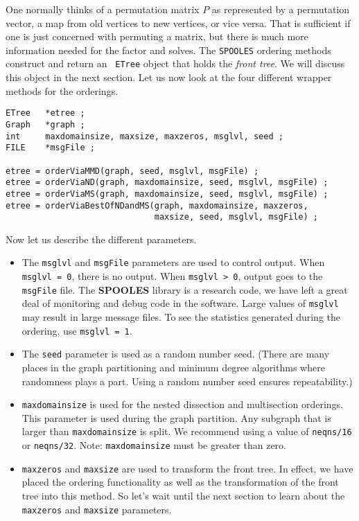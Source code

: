 \par
One normally thinks of a permutation matrix $P$ as represented by a
permutation vector, a map from old vertices to new vertices, or
vice versa.
That is sufficient if one is just concerned with permuting a
matrix, but there is much more information needed for the factor
and solves.
The {\tt SPOOLES} ordering methods construct and return an {\tt
ETree} object that holds the {\it front tree}.
We will discuss this object in the next section.
Let us now look at the four different wrapper methods for the
orderings.
\begin{verbatim}
ETree   *etree ;
Graph   *graph ;
int     maxdomainsize, maxsize, maxzeros, msglvl, seed ;
FILE    *msgFile ;

etree = orderViaMMD(graph, seed, msglvl, msgFile) ;
etree = orderViaND(graph, maxdomainsize, seed, msglvl, msgFile) ;
etree = orderViaMS(graph, maxdomainsize, seed, msglvl, msgFile) ;
etree = orderViaBestOfNDandMS(graph, maxdomainsize, maxzeros, 
                              maxsize, seed, msglvl, msgFile) ;
\end{verbatim}
Now let us describe the different parameters.
\begin{itemize}
\item
The {\tt msglvl} and {\tt msgFile} parameters are used to control
output.
When {\tt msglvl = 0}, there is no output.
When {\tt msglvl > 0}, output goes to the {\tt msgFile} file.
The {\bf SPOOLES} library is a research code, we have left a great
deal of monitoring and debug code in the software.
Large values of {\tt msglvl} may result in large message files.
To see the statistics generated during the ordering, use
{\tt msglvl = 1}.
\item
The {\tt seed} parameter is used as a random number seed.
(There are many places in the graph partitioning and minimum degree
algorithms where randomness plays a part.
Using a random number seed ensures repeatability.)
\item
{\tt maxdomainsize} is used for the nested dissection and
multisection orderings.
This parameter is used during the graph partition.
Any subgraph that is larger than {\tt maxdomainsize} is split.
We recommend using a value of {\tt neqns/16} or {\tt neqns/32}.
Note: {\tt maxdomainsize} must be greater than zero.
\item
{\tt maxzeros} and {\tt maxsize} are used to transform the front tree.
In effect, we have placed the ordering functionality as well as the
transformation of the front tree into this method.
So let's wait until the next section to learn about the
{\tt maxzeros} and {\tt maxsize} parameters.
\end{itemize}
